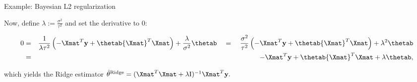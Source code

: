 \begin{vbframe}{Example: Bayesian L2 regularization}
\begin{scriptsize}
\end{scriptsize}

Now, define $\lambda := \frac{\sigma^2}{\tau^2}$ and set the derivative to 0:

\begin{scriptsize}
\begin{eqnarray*}
0 &=& \frac{1}{\lambda \tau^2} \left( - {\Xmat}^T \ydat + \thetab {\Xmat}^T \Xmat
\right) + \frac{\lambda}{\sigma^2} \thetab
\quad = \quad \frac{\sigma^2}{\tau^2} \left( - {\Xmat}^T \ydat + \thetab 
{\Xmat}^T \Xmat \right) + \lambda^2 \thetab \\
&=&  - {\Xmat}^T \ydat + \thetab {\Xmat}^T \Xmat + \lambda \thetab 
,
\end{eqnarray*}
\end{scriptsize}

which yields the Ridge estimator 
$\thetah^{\text{Ridge}} = (\Xmat^T \Xmat  + \lambda \id)^{-1} \Xmat^T\ydat.$

\end{vbframe}






